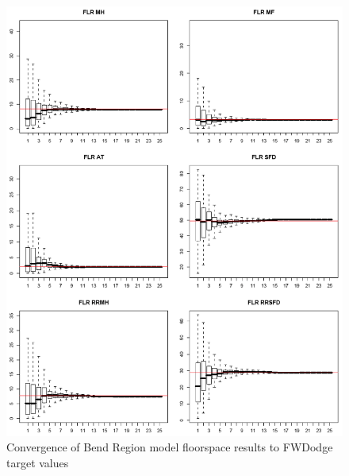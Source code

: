 \begin{figure}
\centering
\includegraphics[width=6in]{ald/bend-floorspace-convergence}
\caption{Convergence of Bend Region model floorspace results to FWDodge target values}
\label{fig:bend-floorspace-convergence}
\end{figure}

